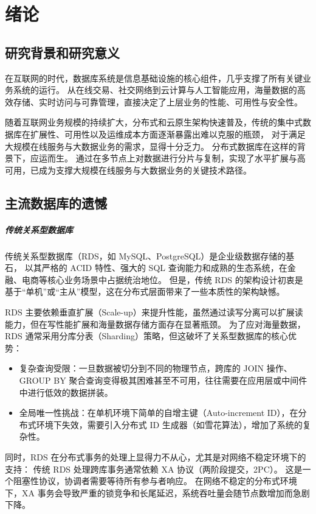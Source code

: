 \chapter{绪论}

\section{研究背景和研究意义}

在互联网的时代，数据库系统是信息基础设施的核心组件，几乎支撑了所有关键业务系统的运行。
从在线交易、社交网络到云计算与人工智能应用，海量数据的高效存储、实时访问与可靠管理，直接决定了上层业务的性能、可用性与安全性。

随着互联网业务规模的持续扩大，分布式和云原生架构快速普及，传统的集中式数据库在扩展性、可用性以及运维成本方面逐渐暴露出难以克服的瓶颈，
对于满足大规模在线服务与大数据业务的需求，显得十分乏力。
分布式数据库在这样的背景下，应运而生。
通过在多节点上对数据进行分片与复制，实现了水平扩展与高可用，已成为支撑大规模在线服务与大数据业务的关键技术路径。


\section{主流数据库的遗憾}
\paragraph{传统关系型数据库}
传统关系型数据库（RDS，如 MySQL、PostgreSQL）是企业级数据存储的基石，
以其严格的 ACID 特性、强大的 SQL 查询能力和成熟的生态系统，在金融、电商等核心业务场景中占据统治地位。
但是，传统 RDS 的架构设计初衷是基于“单机”或“主从”模型，这在分布式层面带来了一些本质性的架构缺憾。

RDS 主要依赖垂直扩展（Scale-up）来提升性能，虽然通过读写分离可以扩展读能力，但在写性能扩展和海量数据存储方面存在显著瓶颈。
为了应对海量数据，RDS 通常采用分库分表（Sharding）策略，但这破坏了关系型数据库的核心优势：
\begin{itemize}
\item 复杂查询受限：一旦数据被切分到不同的物理节点，跨库的 JOIN 操作、GROUP BY 聚合查询变得极其困难甚至不可用，往往需要在应用层或中间件中进行低效的数据拼装。
\item 全局唯一性挑战：在单机环境下简单的自增主键（Auto-increment ID），在分布式环境下失效，需要引入分布式 ID 生成器（如雪花算法），增加了系统的复杂性。
\end{itemize}

同时，RDS 在分布式事务的处理上显得力不从心，尤其是对网络不稳定环境下的支持：
传统 RDS 处理跨库事务通常依赖 XA 协议（两阶段提交，2PC）。
这是一个阻塞性协议，协调者需要等待所有参与者响应。
在网络不稳定的分布式环境下，XA 事务会导致严重的锁竞争和长尾延迟，系统吞吐量会随节点数增加而急剧下降。

